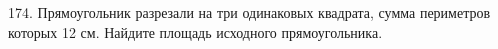 174. Прямоугольник разрезали на три одинаковых квадрата, сумма периметров которых 12 см. Найдите площадь исходного прямоугольника.\\
